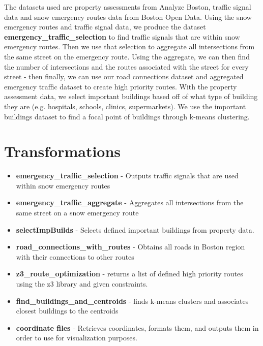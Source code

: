 \documentclass[15pt]{report}
\begin{document}
\noindent The datasets used are property assessments from Analyze Boston, traffic signal data and snow emergency routes data from Boston Open Data. Using the snow emergency routes and traffic signal data, we produce the dataset \textbf{emergency\_traffic\_selection} to find traffic signals that are within snow emergency routes. Then we use that selection to aggregate all intersections from the same street on the emergency route. Using the aggregate, we can then find the number of intersections and the routes associated with the street for every street - then finally, we can use our road connections dataset and aggregated emergency traffic dataset to create high priority routes. With the property assessment data, we select important buildings based off of what type of building they are (e.g. hospitals, schools, clinics, supermarkets). We use the important buildings dataset to find a focal point of buildings through k-means clustering. 

\section*{Transformations}
\begin{itemize}
	\item \textbf{emergency\_traffic\_selection} - Outputs traffic signals that are used within snow emergency routes
	\item \textbf{emergency\_traffic\_aggregate} - Aggregates all intersections from the same street on a snow emergency route
	\item \textbf{selectImpBuilds} - Selects defined important buildings from property data.
	\item \textbf{road\_connections\_with\_routes} - Obtains all roads in Boston region with their connections to other routes
	\item \textbf{z3\_route\_optimization} - returns a list of defined high priority routes using the z3 library and given constraints.
	\item \textbf{find\_buildings\_and\_centroids} - finds k-means clusters and associates closest buildings to the centroids
	\item \textbf{coordinate files} - Retrieves coordinates, formats them, and outputs them in order to use for visualization purposes.
\end{itemize}
\end{document}
